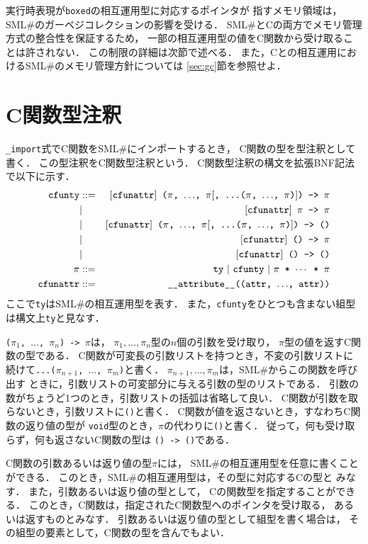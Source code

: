 \documentclass{jbook}
\newcommand{\smlsharp}{SML\#}
\newcommand{\term}[1]{\mbox{{\tt #1}}}
\begin{document}
	実行時表現が{\tt boxed}の相互運用型に対応するポインタが
指すメモリ領域は，
\smlsharp{}のガーベジコレクションの影響を受ける．
	\smlsharp{}とCの両方でメモリ管理方式の整合性を保証するため，
一部の相互運用型の値をC関数から受け取ることは許されない．
	この制限の詳細は次節で述べる．
	また，Cとの相互運用における\smlsharp{}のメモリ管理方針については
\ref{sec:gc}節を参照せよ．

\section{C関数型注釈}

	{\tt \_import}式でC関数を\smlsharp{}にインポートするとき，
C関数の型を型注釈として書く．
	この型注釈をC関数型注釈という．
	C関数型注釈の構文を拡張BNF記法で以下に示す．
\begin{eqnarray*}
\term{cfunty}
&::=& \mbox{\tt $[\term{cfunattr}]$ ($\pi$, $\ldots$, $\pi$$[$, ...($\pi$, $\ldots$, $\pi$)$]$) -> $\pi$}
\\
&|& \mbox{\tt $[\term{cfunattr}]$ $\pi$ -> $\pi$} \\
&|& \mbox{\tt $[\term{cfunattr}]$ ($\pi$, $\ldots$, $\pi$$[$, ...($\pi$, $\ldots$, $\pi$)$]$) -> ()}\\
&|& \mbox{\tt $[\term{cfunattr}]$ () -> $\pi$}\\
&|& \mbox{\tt $[\term{cfunattr}]$ () -> ()}
\\
\pi
&::=& \term{ty}
\ |\  \term{cfunty}
\ |\  \mbox{\tt $\pi$ * $\cdots$ * $\pi$}
\\
\term{cfunattr}
&::=& \mbox{\tt \_\_attribute\_\_((\term{attr}, $\ldots$, \term{attr}))}
\end{eqnarray*}
	ここで\term{ty}は\smlsharp{}の相互運用型を表す．
	また，\term{cfunty}をひとつも含まない組型は構文上\term{ty}と見なす．

	{\tt ($\pi_1$, $\ldots$, $\pi_n$) -> $\pi$}は，
$\pi_1, \ldots, \pi_n$型の$n$個の引数を受け取り，
$\pi$型の値を返すC関数の型である．
	C関数が可変長の引数リストを持つとき，不変の引数リストに
続けて{\tt ...($\pi_{n+1}$, $\ldots$, $\pi_{m}$)}と書く．
	$\pi_{n+1}, \ldots, \pi_m$は，\smlsharp{}からこの関数を呼び出す
ときに，引数リストの可変部分に与える引数の型のリストである．
	引数の数がちょうど1つのとき，引数リストの括弧は省略して良い．
        C関数が引数を取らないとき，引数リストに{\tt ()}と書く．
	C関数が値を返さないとき，すなわちC関数の返り値の型が
{\tt void}型のとき，$\pi$の代わりに{\tt ()}と書く．
	従って，何も受け取らず，何も返さないC関数の型は
{\tt () -> ()}である．

	C関数の引数あるいは返り値の型$\pi$には，
\smlsharp{}の相互運用型を任意に書くことができる．
	このとき，\smlsharp{}の相互運用型は，その型に対応するCの型と
みなす．
	また，引数あるいは返り値の型として，
Cの関数型を指定することができる．
	このとき，C関数は，指定されたC関数型へのポインタを受け取る，
あるいは返すものとみなす．
	引数あるいは返り値の型として組型を書く場合は，
その組型の要素として，C関数の型を含んでもよい．
\end{document}
